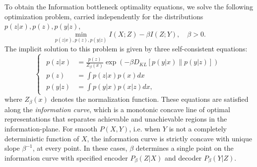 \documentclass[11pt]{article}
\begin{document}
To obtain the Information bottleneck optimality equations, we solve the following optimization problem, carried independently for the distributions $p(z\vert x), p(z), p(y\vert z)$,
\begin{equation}
\underset{p(z\vert x), p(z), p(y\vert z)}{\min} I(X;Z) - \beta I(Z;Y), \quad\beta>0.
\end{equation}
The implicit solution to this problem is given by three self-consistent equations:
\begin{equation}
\begin{cases}
\begin{array}{rl}
p(z\vert x) & =\frac{p(z)}{Z_{\beta}(x)}\exp\left(-\beta D_{KL}\left[p(y\vert x)\rVert p(y\vert z)\right]\right)\\
p(z) & =\int p(z\vert x)p(x)dx\\
p(y\vert z) & =\int p(y\vert x)p(x\vert z)dx,
\end{array}
\end{cases}
\end{equation}
where $Z_\beta(x)$ denotes the normalization function. These equations are satisfied along the \emph{information curve}, which is a monotonic concave line of optimal representations that separates achievable and unachievable regions in the information-plane. For smooth $P(X,Y)$, i.e. when $Y$ is not a completely deterministic function of $X$, the information curve is strictly concave with unique slope $\beta^{-1}$, at every point.  In these cases, $\beta$ determines a single point on the information curve with specified encoder $P_\beta(Z\vert X)$ and decoder $P_\beta(Y\vert Z)$.
\end{document}
